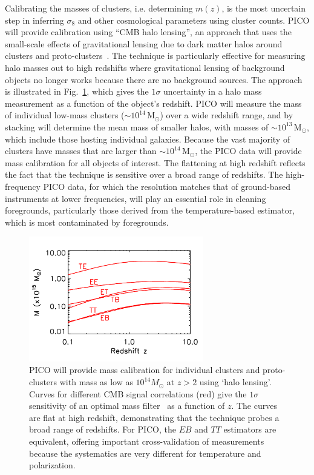 \documentclass[PICOAPC.tex]{subfiles}
\begin{document}
Calibrating the masses of clusters, i.e. determining $m(z)$, is the most uncertain step in inferring $\sigma_{8}$ and other cosmological parameters using cluster counts.  PICO will provide calibration using ``CMB halo lensing'', an approach that uses the small-scale effects of gravitational lensing due to dark matter halos around clusters and proto-clusters~\citep{2015ApJ...806..247B, 2015PhRvL.114o1302M, 2016A&A...594A..24P}. The technique is particularly effective for measuring halo masses out to high redshifts where gravitational lensing of background objects no longer works because there are no background sources. 
The approach is illustrated in Fig.~\ref{fig:HaloLensing}, which gives the $1\sigma$ uncertainty in a halo mass measurement as a function of the object's redshift. PICO will measure the mass of individual low-mass clusters ($\sim 10^{14}$\,M$_\odot$) over a wide redshift range, and by stacking will determine the mean mass of smaller halos, with masses of $\sim 10^{13}$\,M$_\odot$, which include those hosting individual galaxies. Because the vast majority of clusters have masses that are larger than $\sim 10^{14}$\,M$_\odot$, the PICO data will provide mass calibration for all objects of interest. The flattening at high redshift reflects the fact that the technique is sensitive over a broad range of redshifts. The high-frequency PICO data, for which the resolution matches that of ground-based instruments at lower frequencies, will play an essential role in cleaning foregrounds, particularly those derived from the temperature-based estimator, which is most contaminated by foregrounds. 
\begin{figure}[h]
\vspace{-0.1in}
\hspace{-0.1in}
\parbox{3.1in}{\centerline {
\includegraphics[width=3.0in]{images/m500lim_vs_z_pico_polar_v4.pdf} } }
\hspace{0.in}
\parbox{3.4in}{
\caption{\captiontext 
PICO will provide mass calibration for individual clusters and proto-clusters with mass as low as $10^{14}M_\odot$ at $z>2$ using `halo lensing'. Curves for different CMB signal correlations (red) give the $1\sigma$ sensitivity of an optimal mass filter~\citep{2015A&A...578A..21M} as a function of $z$.  The curves are flat at high redshift, demonstrating that the technique probes a broad range of redshifts. For PICO, the $EB$ and $TT$ estimators are equivalent, offering important cross-validation of measurements because the systematics are very different for temperature and polarization. 
\label{fig:HaloLensing} } }
\vspace{-0.2in}
\end{figure}
\end{document}
